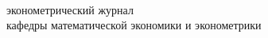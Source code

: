 \documentclass[final, pdftex, 12pt]{../../template/epsilonj}
\begin{document}

\pagestyle{empty}

\ \vfill

\centering 
{}

\vspace{15mm}


\vspace{15mm}


\vfill

эконометрический журнал \\ кафедры математической экономики и эконометрики%
\end{document}
